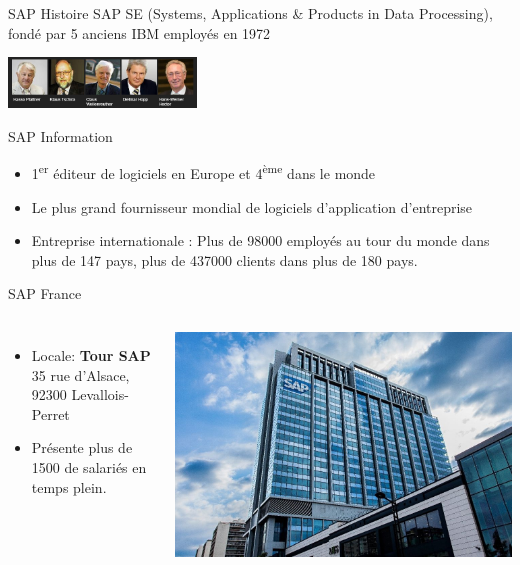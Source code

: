\documentclass{beamer}
\begin{document}
        \begin{frame}
            \begin{block} {SAP Histoire}
                SAP SE (Systems, Applications \& Products in Data Processing), fondé par 5 anciens IBM employés en 1972
            \end{block}
            \includegraphics[width=5cm,]{sap_founders.jpg}
            \begin{block}{SAP Information}
            \begin{itemize}
                \item 1\textsuperscript{er} éditeur de logiciels en Europe et 4\textsuperscript{ème} dans le monde
                \item Le plus grand fournisseur mondial de logiciels d’application d’entreprise
                \item Entreprise internationale : Plus de 98000 employés au tour du monde dans plus de 147 pays, plus de 437000 clients dans plus de 180 pays.
                
            \end{itemize}
            \end{block}
            
            \begin{block}{SAP France}
                \begin{columns}
                \begin{itemize}
                    \item Locale: \textbf{Tour SAP} 35 rue d’Alsace, 92300 Levallois-Perret
                    \item Présente plus de 1500 de salariés en temps plein.
                \end{itemize}
                
                \includegraphics[width=\textwidth]{sap-france.jpg}
                \end{columns}
            \end{block}
            
        \end{frame}
        
\end{document}
